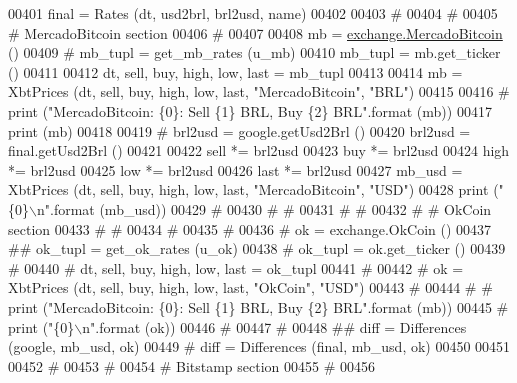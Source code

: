 \begin{DoxyCode}
{{{{{00401     final = Rates (dt, usd2brl, brl2usd, name)
00402     
00403     \textcolor{comment}{#}
00404     \textcolor{comment}{#}
00405     \textcolor{comment}{# MercadoBitcoin section }
00406     \textcolor{comment}{# }
00407     
00408     mb = \hyperlink{classexchange_1_1_mercado_bitcoin}{exchange.MercadoBitcoin} ()    
00409 \textcolor{comment}{#    mb\_tupl = get\_mb\_rates (u\_mb)}
00410     mb\_tupl = mb.get\_ticker ()
00411     
00412     dt, sell, buy, high, low, last = mb\_tupl
00413     
00414     mb = XbtPrices (dt, sell, buy, high, low, last, \textcolor{stringliteral}{"MercadoBitcoin"}, \textcolor{stringliteral}{"BRL"})
00415     
00416     \textcolor{comment}{# print ("MercadoBitcoin: \{0\}: Sell \{1\} BRL, Buy \{2\} BRL".format (mb))}
00417     \textcolor{keywordflow}{print} (mb)
00418      
00419 \textcolor{comment}{#    brl2usd = google.getUsd2Brl ()}
00420     brl2usd = final.getUsd2Brl ()
00421     
00422     sell *= brl2usd
00423     buy  *= brl2usd 
00424     high *= brl2usd
00425     low  *= brl2usd 
00426     last *= brl2usd
00427     mb\_usd = XbtPrices (dt, sell, buy, high, low, last, \textcolor{stringliteral}{"MercadoBitcoin"}, \textcolor{stringliteral}{"USD"})
00428     \textcolor{keywordflow}{print} (\textcolor{stringliteral}{"\{0\}\(\backslash\)n"}.format (mb\_usd))
00429 \textcolor{comment}{#    }
00430 \textcolor{comment}{#    #}
00431 \textcolor{comment}{#    #}
00432 \textcolor{comment}{#    # OkCoin section }
00433 \textcolor{comment}{#    # }
00434 \textcolor{comment}{#    }
00435 \textcolor{comment}{#}
00436 \textcolor{comment}{#    ok = exchange.OkCoin ()        }
00437 \textcolor{comment}{##    ok\_tupl = get\_ok\_rates (u\_ok)}
00438 \textcolor{comment}{#    ok\_tupl = ok.get\_ticker ()}
00439 \textcolor{comment}{#    }
00440 \textcolor{comment}{#    dt, sell, buy, high, low, last = ok\_tupl}
00441 \textcolor{comment}{#    }
00442 \textcolor{comment}{#    ok = XbtPrices (dt, sell, buy, high, low, last, "OkCoin", "USD")}
00443 \textcolor{comment}{#    }
00444 \textcolor{comment}{#    # print ("MercadoBitcoin: \{0\}: Sell \{1\} BRL, Buy \{2\} BRL".format (mb))}
00445 \textcolor{comment}{#    print ("\{0\}\(\backslash\)n".format (ok))}
00446 \textcolor{comment}{#     }
00447 \textcolor{comment}{#    }
00448 \textcolor{comment}{##    diff = Differences (google, mb\_usd, ok)}
00449 \textcolor{comment}{#    diff = Differences (final, mb\_usd, ok)}
00450 
00451     
00452     \textcolor{comment}{#}
00453     \textcolor{comment}{#}
00454     \textcolor{comment}{# Bitstamp section }
00455     \textcolor{comment}{# }
00456     
}}}}}
\end{DoxyCode}
